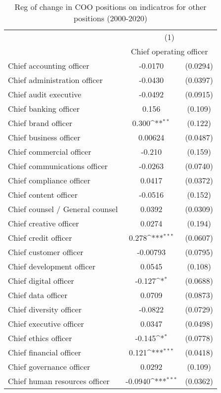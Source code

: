 \begin{table}[htbp]\centering
\def\sym#1{\ifmmode^{#1}\else\(^{#1}\)\fi}
\caption{Reg of change in COO positions on indicatros for other positions (2000-2020)}
\begin{tabular}{l*{1}{cc}}
\toprule
                &\multicolumn{2}{c}{(1)}     \\
                &\multicolumn{2}{c}{Chief operating officer}\\
\midrule
Chief accounting officer&  -0.0170         & (0.0294)\\
Chief administration officer&  -0.0430         & (0.0397)\\
Chief audit executive&  -0.0492         & (0.0915)\\
Chief banking officer&    0.156         &  (0.109)\\
Chief brand officer&    0.300\sym{**} &  (0.122)\\
Chief business officer&  0.00624         & (0.0487)\\
Chief commercial officer&   -0.210         &  (0.159)\\
Chief communications officer&  -0.0263         & (0.0740)\\
Chief compliance officer&   0.0417         & (0.0372)\\
Chief content officer&  -0.0516         &  (0.152)\\
Chief counsel / General counsel&   0.0392         & (0.0309)\\
Chief creative officer&   0.0274         &  (0.194)\\
Chief credit officer&    0.278\sym{***}& (0.0607)\\
Chief customer officer& -0.00793         & (0.0795)\\
Chief development officer&   0.0545         &  (0.108)\\
Chief digital officer&   -0.127\sym{*}  & (0.0688)\\
Chief data officer&   0.0709         & (0.0873)\\
Chief diversity officer&  -0.0822         & (0.0729)\\
Chief executive officer&   0.0347         & (0.0498)\\
Chief ethics officer&   -0.145\sym{*}  & (0.0778)\\
Chief financial officer&    0.121\sym{***}& (0.0418)\\
Chief governance officer&   0.0292         &  (0.109)\\
Chief human resources officer&  -0.0940\sym{***}& (0.0362)\\

\end{tabular}
\end{table}
